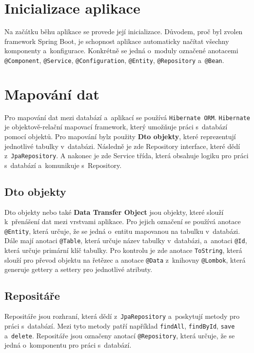 \section{Inicializace aplikace}
Na začátku běhu aplikace se provede její inicializace.  
Důvodem, proč byl zvolen framework Spring Boot, je schopnost aplikace automaticky 
načítat všechny komponenty a~konfigurace.  
Konkrétně se jedná o~moduly označené anotacemi \texttt{@Component}, \texttt{@Service}, 
\texttt{@Configuration}, \texttt{@Entity}, \texttt{@Repository} a~\texttt{@Bean}.

\section{Mapování dat}
\label{sec:mapovaniDat}
Pro mapování dat mezi databází a~aplikací se používá \texttt{Hibernate ORM}.
\texttt{Hibernate} je objektově-relační mapovací framework, který umožňuje práci s~databází pomocí objektů.
Pro mapování bylz použity \textbf{Dto objekty}, které reprezentují jednotlivé tabulky v~databázi.
Následně je zde Repository interface, které dědí z~\texttt{JpaRepository}.
A nakonec je zde Service třída, která obsahuje logiku pro práci s~databází a~komunikuje s~Repository.

\subsection{Dto objekty}
Dto objekty nebo také \textbf{Data Transfer Object} jsou objekty, které slouží k~přenášení dat mezi vrstvami aplikace.
Pro jejich označení se používá anotace \texttt{@Entity}, která určuje, že se jedná o~entitu mapovanou na tabulku v~databázi.
Dále mají anotaci \texttt{@Table}, která určuje název tabulky v~databázi, a~anotaci \texttt{@Id}, která určuje primární klíč tabulky.
Pro kontrolu je zde anotace \texttt{ToString}, která slouží pro převod objektu na řetězec a anotace \texttt{@Data} 
z~knihovny \texttt{@Lombok}, která generuje gettery a settery pro jednotlivé atributy.

\subsection{Repositáře}
Repositáře jsou rozhraní, která dědí z~\texttt{JpaRepository} a~poskytují metody pro práci s~databází.
Mezi tyto metody patří například \texttt{findAll}, \texttt{findById}, \texttt{save} a~\texttt{delete}.
Repositáře jsou označeny anotací \texttt{@Repository}, která určuje, že se jedná o~komponentu pro práci s~databází.

